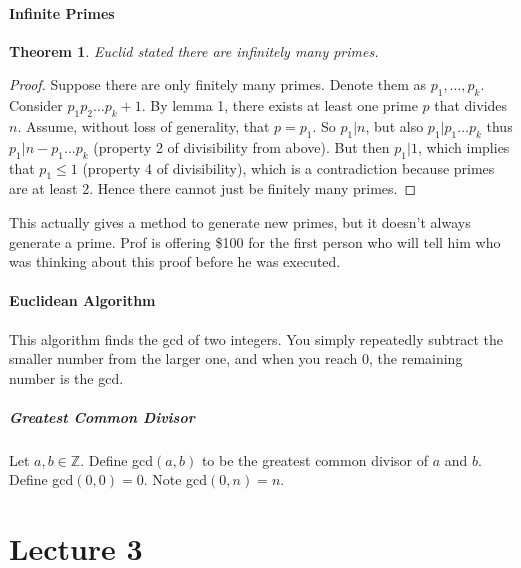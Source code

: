 \documentclass[10pt,letter]{article}
\theoremstyle{plain}
\newtheorem*{theorem*}{Theorem}
\theoremstyle{definition}
\begin{document}
\paragraph{Infinite Primes}
\begin{theorem*}
Euclid stated there are infinitely many primes.
\end{theorem*}
\begin{proof}
Suppose there are only finitely many primes. Denote them as $p_1,\ldots,p_k$. Consider $p_1p_2\ldots p_k+1$. By lemma 1, there exists at least one prime $p$ that divides $n$. Assume, without loss of generality, that $p=p_1$. So $p_1|n$, but also $p_1|p_1\ldots p_k$ thus $p_1|n-p_1\ldots p_k$ (property 2 of divisibility from above). But then $p_1|1$, which implies that $p_1\leq1$ (property 4 of divisibility), which is a contradiction because primes are at least 2. Hence there cannot just be finitely many primes. 
\end{proof}
This actually gives a method to generate new primes, but it doesn't always generate a prime. Prof is offering \$100 for the first person who will tell him who was thinking about this proof before he was executed. 

\paragraph{Euclidean Algorithm}
This algorithm finds the gcd of two integers. You simply repeatedly subtract the smaller number from the larger one, and when you reach 0, the remaining number is the gcd. 
\subparagraph{Greatest Common Divisor}
Let $a,b\in\mathbb{Z}$. Define gcd$(a,b)$ to be the greatest common divisor of $a$ and $b$. Define gcd$(0,0)=0$. Note gcd$(0,n)=n$. 

\section*{Lecture 3}
\end{document}
